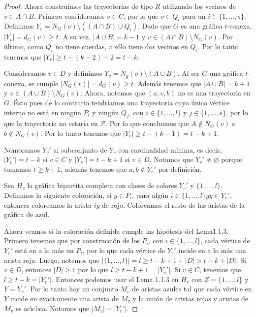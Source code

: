 \begin{proof}
    Ahora construimos las trayectorias de tipo $R$ utilizando los vecinos de $v
    \in A \cap B$. Primero consideramos $v \in C$, por lo que $v \in Q_i$ para
    un  $i \in \{1, \dots, s\}$. Definimos $Y_v = N_G(v) \setminus ((A \cap B)
    \cup Q_i)$. Dado que $G$ es una gr\'afica $t$-conexa, $|Y_v| = d_G(v) \geq
    t$. A su vez, $|A \cup B| =k -1$ y $v \in (A \cap B) \setminus N_G(v)$. Por
    \'ultimo, como $Q_i$ no tiene cuerdas, $v$ s\'olo tiene dos vecinos en
    $Q_i$. Por lo tanto tenemos que $|Y_v| \geq t- (k-2)-2 = t-k$. 
    
    Consideramos $v \in D$ y definimos $Y_v = N_g(v) \setminus (A \cup
    B)$. Al ser $G$ una gr\'afica $t$-conexa, se cumple $|N_G(v)| = d_G(v) \geq
    t$. Adem\'as tenemos que $|A \cup B| = k + 1$ y $v \in (A \cup B) \setminus
    N_G(v)$. Ahora, notemos que $(a, v, b)$ no es una trayectoria en $G$. \'Esto
    pues de lo contrario tendr\'i{}amos una trayectoria cuyo \'unico v\'ertice
    interno no est\'a en ning\'un $P_i$ y ning\'un $Q_j$, con $i \in \{1, \dots,
    l\}$ y $j \in \{1, \dots, s\}$, por lo que la trayectoria no estar\'i{}a en
    $\mathcal{P}$. Por lo que concluimos que $A \notin N_G(v)$ o $b \notin
    N_G(v)$. Por lo tanto tenemos que $|Y_v| \geq t- (k-1) = t-k + 1$.

    Nombramos $Y_v '$ al subconjunto de $Y_v$ con cardinalidad m\'i{}nima, es
    decir, $|Y_v '| = t-k$ si $v \in C$ y $|Y_v '| = t- k+ 1$ si $v \in D$.
    Notamos que $Y_v ' \neq \varnothing$ porque tomamos $t \geq k + 1$, adem\'as
    tenemos que $a, b \notin Y_v '$ por definici\'on. 

    Sea $H_v$ la gr\'afica bipartita completa con clases de colores $Y_v '$ y
    $\{1,\dots, l\}$. Definimos la siguiente coloraci\'on, si $y \in P_i$, para
    alg\'un $i \in \{1, \dots, l\} y y \in Y_v '$, entonces coloreamos la arista
    $iy$ de rojo. Coloreamos el resto de las aristas de la gr\'afica de azul.
    
    Ahora veamos si la coloraci\'on definida cumple las hip\'otesis del
    Lema1.1.3. Primero tenemos que por construcci\'on de los $P_i$, con $i \in
    \{1, \dots, l\}$, cada v\'ertice de $Y_v '$ est\'a en a lo m\'as un $P_i$,
    por lo que cada v\'ertice de $Y_v '$ incide en a lo m\'as una arista roja.
    Luego, notemos que $|\{1, \dots, l\}| = l  \geq t-k+ 1+ |D| > t-k + |D|$. Si
    $v \in D$, entonces $|D| \geq 1$ por lo que $l \geq t- k+1 = |Y_v '|$. Si $v
    \in C$, tenemos que $l \geq t-k = |Y_v '|$. Entonces podemos usar el Lema
    1.1.3 en $H_v$ con $Z= \{1, \dots, l\}$ y $Y = Y_v '$. Por lo tanto hay un
    conjunto $M_v$ de aristas azules tal que cada v\'ertice en $Y$ incide en
    exactamente una arista de $M_v$ y la uni\'on de aristas rojas y aristas de
    $M_v$ es ac\'\i{}clica. Notamos que $|M_v|=|Y_v '|$.


\end{proof}
